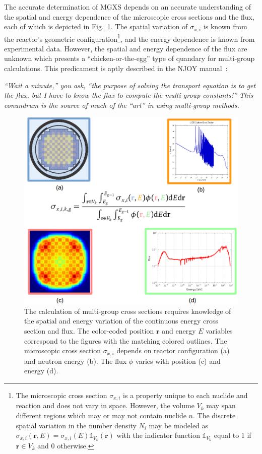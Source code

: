 The accurate determination of \ac{MGXS} depends on an accurate understanding of the spatial and energy dependence of the microscopic cross sections and the flux, each of which is depicted in Fig.~\ref{fig:chap2-mgxs-overlay}. The spatial variation of $\sigma_{x,i}$ is known from the reactor's geometric configuration\footnote{The microscopic cross section $\sigma_{x,i}$ is a property unique to each nuclide and reaction and does not vary in space. However, the volume $V_{k}$ may span different regions which may or may not contain nuclide $n$. The discrete spatial variation in the number density $N_{i}$ may be modeled as $\sigma_{x,i}(\mathbf{r},E) = \sigma_{x,i}(E)\mathbb{1}_{V_{k}}(\mathbf{r})$ with the indicator function $\mathbb{1}_{V_{k}}$ equal to 1 if $\mathbf{r} \in V_{k}$ and 0 otherwise.}, and the energy dependence is known from experimental data. However, the spatial and energy dependence of the flux are unknown which presents a ``chicken-or-the-egg'' type of quandary for multi-group calculations. This predicament is aptly described in the NJOY manual~\cite{macfarlane2000njoy}:

\begin{displayquote}
\textit{``Wait a minute,'' you ask, ``the purpose of solving the transport equation is to get the flux, but I have to know the flux to compute the multi-group constants!'' This conundrum is the source of much of the ``art'' in using multi-group methods.}
\end{displayquote}

\begin{figure}[h!]
  \centering
  \includegraphics[width=0.9\linewidth]{figures/mgxs/mgxs-overlay}
\caption[Energy and spatial variation in \ac{MGXS}]{The calculation of multi-group cross sections requires knowledge of the spatial and energy variation of the continuous energy cross section and flux. The color-coded position $\mathbf{r}$ and energy $E$ variables correspond to the figures with the matching colored outlines. The microscopic cross section $\sigma_{x,i}$ depends on reactor configuration (a) and neutron energy (b). The flux $\phi$ varies with position (c) and energy (d).}
\label{fig:chap2-mgxs-overlay}
\end{figure}

